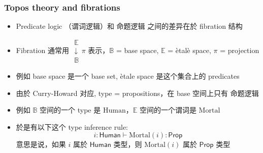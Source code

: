 \documentclass[16pt]{beamer}
\begin{document}
\begin{frame}
\frametitle{Topos theory and fibrations}
\begin{itemize}
	\item Predicate logic （谓词逻辑）和 命题逻辑 之间的差异在於 fibration 结构
	\item Fibration 通常用 $\mathrel{\substack{\mathbb{E}\\\downarrow \\\mathbb{B}}  {\scriptstyle \pi}}$ 表示，$\mathbb{B}$ = base space, $\mathbb{E}$ = \`{e}tal\`{e} space, $\pi$ = projection
	\item 例如 base space 是一个 base set, \`{e}tale space 是这个集合上的 predicates
	\item 由於 Curry-Howard 对应, type = propositions，在 base 空间上只有 命题逻辑
	\item 例如 $\mathbb{B}$ 空间的一个 type 是 $\mathrm{Human}$，$\mathbb{E}$ 空间的一个谓词是 $\mathrm{Mortal}$
	\item 於是有以下这个 type inference rule:
	\begin{equation}
	i:\mathsf{Human} \vdash \mathrm{Mortal}(i): \mathsf{Prop}
	\end{equation}
	意思是说，如果 $i$ 属於 $\mathsf{Human}$ 类型，则 $\mathrm{Mortal}(i)$ 属於 $\mathsf{Prop}$ 类型
\end{itemize}
\end{frame}
\end{document}
